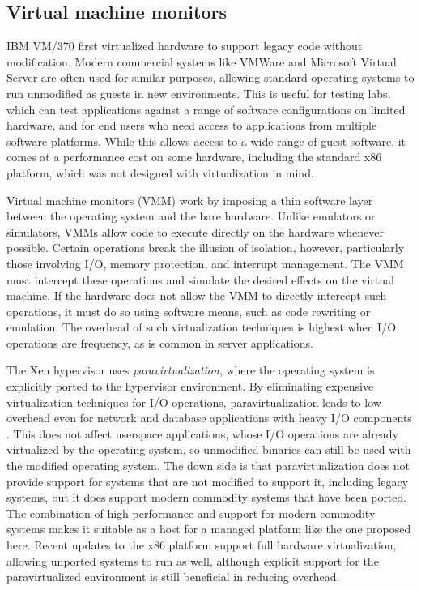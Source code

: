\subsection{Virtual machine monitors}

IBM VM/370 \cite{gum} first virtualized hardware to support legacy code without modification. Modern commercial systems like VMWare \cite{vmware} and Microsoft Virtual Server \cite{microsoftvm} are often used for similar purposes, allowing standard operating systems to run unmodified as guests in new environments. This is useful for testing labs, which can test applications against a range of software configurations on limited hardware, and for end users who need access to applications from multiple software platforms. While this allows access to a wide range of guest software, it comes at a performance cost on some hardware, including the standard x86 platform, which was not designed with virtualization in mind.

Virtual machine monitors (VMM) work by imposing a thin software layer between the operating system and the bare hardware. Unlike emulators or simulators, VMMs allow code to execute directly on the hardware whenever possible. Certain operations break the illusion of isolation, however, particularly those involving I/O, memory protection, and interrupt management. The VMM must intercept these operations and simulate the desired effects on the virtual machine. If the hardware does not allow the VMM to directly intercept such operations, it must do so using software means, such as code rewriting or emulation. The overhead of such virtualization techniques is highest when I/O operations are frequency, as is common in server applications.

The Xen hypervisor uses \emph{paravirtualization}, where the operating system is explicitly ported to the hypervisor environment. By eliminating expensive virtualization techniques for I/O operations, paravirtualization leads to low overhead even for network and database applications with heavy I/O components \cite{barham}. This does not affect userspace applications, whose I/O operations are already virtualized by the operating system, so unmodified binaries can still be used with the modified operating system. The down side is that paravirtualization does not provide support for systems that are not modified to support it, including legacy systems, but it does support modern commodity systems that have been ported. The combination of high performance and support for modern commodity systems makes it suitable as a host for a managed platform like the one proposed here. Recent updates to the x86 platform support full hardware virtualization, allowing unported systems to run as well, although explicit support for the paravirtualized environment is still beneficial in reducing overhead.


